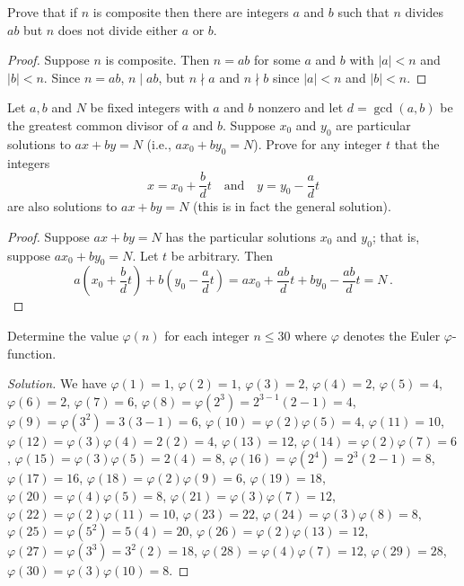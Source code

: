 
\begin{exercise}
	Prove that if $n$ is composite then there are integers $a$ and $b$ such that $n$ divides $ab$ but $n$ does not divide either $a$ or $b$.
\end{exercise}

\begin{proof}
	Suppose $n$ is composite. Then $n = ab$ for some $a$ and $b$ with $|a| < n$ and $|b| < n$. Since $n = ab$, $n \mid ab$, but $n \nmid a$ and $n \nmid b$ since $|a| < n$ and $|b| < n$.
\end{proof}


\begin{exercise}
	Let $a,b$ and $N$ be fixed integers with $a$ and $b$ nonzero and let $d = \gcd(a,b)$ be the greatest common divisor of $a$ and $b$. Suppose $x_0$ and $y_0$ are particular solutions to $ax + by = N$ (i.e., $ax_0 + by_0 = N$). Prove for any integer $t$ that the integers
	\[
		x = x_0 + \frac{b}{d}t
		\quad
		\text{and}
		\quad
		y = y_0 - \frac{a}{d}t
	\]
	are also solutions to $ax + by = N$ (this is in fact the general solution).
\end{exercise}

\begin{proof}
	Suppose $ax + by = N$ has the particular solutions $x_0$ and $y_0$; that is, suppose $ax_0 + by_0 = N$. Let $t$ be arbitrary. Then
	\[
		a \left( x_0 + \frac{b}{d}t \right) +
		b \left( y_0 - \frac{a}{d}t \right) 
			= ax_0 + \frac{ab}{d}t + by_0 - \frac{ab}{d}t
			= N\,.
	\]
\end{proof}


\begin{exercise}
	Determine the value $\varphi(n)$ for each integer $n \leq 30$ where $\varphi$ denotes the Euler $\varphi$-function.
\end{exercise}

\begin{proof}[Solution]
	We have $\varphi(1) = 1$, $\varphi(2) = 1$, $\varphi(3) = 2$, $\varphi(4) = 2$, $\varphi(5) = 4$, $\varphi(6) = 2$, $\varphi(7) = 6$, $\varphi(8) = \varphi(2^3) = 2^{3-1}(2-1) = 4$, $\varphi(9) = \varphi(3^2) = 3(3-1) = 6$, $\varphi(10) = \varphi(2)\varphi(5) = 4$, $\varphi(11) = 10$, $\varphi(12) = \varphi(3)\varphi(4) = 2(2) = 4$, $\varphi(13) = 12$, $\varphi(14) = \varphi(2)\varphi(7) = 6$, $\varphi(15) = \varphi(3)\varphi(5) = 2(4) = 8$, $\varphi(16) = \varphi(2^4) = 2^3(2-1) = 8$, $\varphi(17) = 16$, $\varphi(18) = \varphi(2)\varphi(9) = 6$, $\varphi(19) = 18$, $\varphi(20) = \varphi(4)\varphi(5) = 8$, $\varphi(21) = \varphi(3)\varphi(7) = 12$, $\varphi(22) = \varphi(2)\varphi(11) = 10$, $\varphi(23) = 22$, $\varphi(24) = \varphi(3)\varphi(8) = 8$, $\varphi(25) = \varphi(5^2) = 5(4) = 20$, $\varphi(26) = \varphi(2)\varphi(13) = 12$, $\varphi(27) = \varphi(3^3) = 3^2(2) = 18$, $\varphi(28) = \varphi(4)\varphi(7) = 12$, $\varphi(29) = 28$, $\varphi(30) = \varphi(3)\varphi(10) = 8$.
\end{proof}

